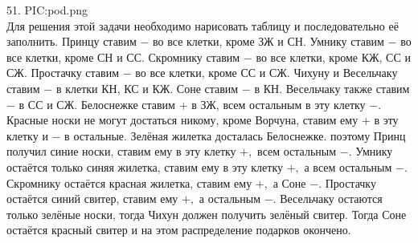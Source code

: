 51.
{{PIC:pod.png}}\\
Для решения этой задачи необходимо нарисовать таблицу и последовательно её заполнить. Принцу ставим $-$ во все клетки, кроме ЗЖ и СН. Умнику ставим $-$ во все клетки, кроме СН и СС. Скромнику ставим $-$ во все клетки, кроме КЖ, СС и СЖ. Простачку ставим $-$ во все клетки, кроме СС и СЖ. Чихуну и Весельчаку ставим $-$ в клетки КН, КС и КЖ. Соне ставим $-$ в КН. Весельчаку также ставим $-$ в СС и СЖ. Белоснежке ставим $+$ в ЗЖ, всем остальным в эту клетку $-$. Красные носки не могут достаться никому, кроме Ворчуна, ставим ему $+$ в эту клетку и $-$ в остальные. Зелёная жилетка досталась Белоснежке. поэтому Принц получил синие носки, ставим ему в эту клетку $+,$ всем остальным $-.$ Умнику остаётся только синяя жилетка, ставим ему в эту клетку $+,$ а всем остальным $-.$ Скромнику остаётся красная жилетка, ставим ему $+,$ а Соне $-.$ Простачку остаётся синий свитер, ставим ему $+,$ а остальным $-.$ Весельчаку остаются только зелёные носки, тогда Чихун должен получить зелёный свитер. Тогда Соне остаётся красный свитер и на этом распределение подарков окончено.\\
